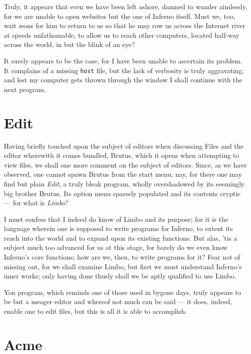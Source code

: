 \documentclass[a5paper,twoside,12pt]{report}
\begin{document}
    Truly, it appears that even we have been left ashore, damned to wander aimlessly, for we are unable to open websites but the one of Inferno itself. Must we, too, wait æons for him to return to us so that he may row us across the Internet river at speeds unfathomable, to allow us to reach other computers, located half-way across the world, in but the blink of an eye?


    It surely appears to be the case, for I have been unable to ascertain its problem. It complains of a missing \texttt{host} file, but the lack of verbosity is truly aggravating; and lest my computer gets thrown through the window I shall continue with the next program.

    \section*{Edit}


    Having briefly touched upon the subject of editors when discussing Files and the editor wherewith it comes bundled, Brutus, which it opens when attempting to view files, we shall one more comment on the subject of editors. Since, as we have observed, one cannot spawn Brutus from the start menu; nay, for there one may find but plain \textit{Edit}, a truly bleak program, wholly overshadowed by its seemingly big brother Brutus. Its option menu sparsely populated and its contents cryptic — for what is \textit{Limbo}?

    I must confess that I indeed do know of Limbo and its purpose; for it is the language wherein one is supposed to write programs for Inferno, to extent its reach into the world and to expand upon its existing functions. But alas, 'tis a subject much too advanced for us at this stage, for barely do we even know Inferno's core functions; how are we, then, to write programs for it? Fear not of missing out, for we shall examine Limbo, but first we must understand Inferno's inner works; only having done thusly shall we be aptly qualified to use Limbo.

    Yon program, which reminds one of those used in bygone days, truly appears to be but a meager editor and whereof not much can be said — it does, indeed, enable one to edit files, but this is all it is able to accomplish.

    \section*{Acme}
\end{document}
